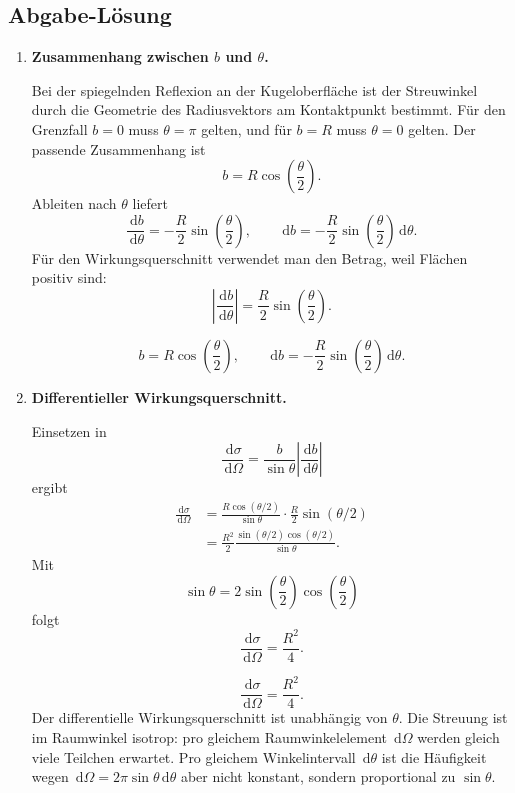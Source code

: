 \documentclass[11pt,a4paper]{scrartcl}
\newcommand{\abs}[1]{\left| #1 \right|}
\newcommand{\paren}[1]{\left( #1 \right)}
\newcommand{\dd}{\,\mathrm{d}}
\newcommand{\dv}[2]{\frac{\dd #1}{\dd #2}}
\newcommand{\diffxs}{\frac{\dd\sigma}{\dd\Omega}}
\theoremstyle{definition}
\theoremstyle{plain}
\theoremstyle{remark}
\begin{document}
\subsection{Abgabe-Lösung}

\begin{enumerate}[label=(\alph*)]
    \item \textbf{Zusammenhang zwischen $b$ und $\theta$.}

    \begin{calculationbox}
    Bei der spiegelnden Reflexion an der Kugeloberfläche ist der Streuwinkel durch die Geometrie des Radiusvektors am Kontaktpunkt bestimmt. Für den Grenzfall $b=0$ muss $\theta=\pi$ gelten, und für $b=R$ muss $\theta=0$ gelten. Der passende Zusammenhang ist
    \[
        b=R\cos\paren{\frac{\theta}{2}}.
    \]
    Ableiten nach $\theta$ liefert
    \[
        \dv{b}{\theta}
        = -\frac{R}{2}\sin\paren{\frac{\theta}{2}},
        \qquad
        \dd b = -\frac{R}{2}\sin\paren{\frac{\theta}{2}}\dd\theta.
    \]
    Für den Wirkungsquerschnitt verwendet man den Betrag, weil Flächen positiv sind:
    \[
        \abs{\dv{b}{\theta} }
        =\frac{R}{2}\sin\paren{\frac{\theta}{2}}.
    \]
    \end{calculationbox}

    \begin{answerbox}
    \[
        \boxed{b=R\cos\paren{\frac{\theta}{2}}},
        \qquad
        \boxed{\dd b=-\frac{R}{2}\sin\paren{\frac{\theta}{2}}\dd\theta}.
    \]
    \end{answerbox}

    \item \textbf{Differentieller Wirkungsquerschnitt.}

    \begin{calculationbox}
    Einsetzen in
    \[
        \diffxs = \frac{b}{\sin\theta}\abs{\dv{b}{\theta}}
    \]
    ergibt
    \begin{align*}
        \diffxs
        &= \frac{R\cos(\theta/2)}{\sin\theta}
           \cdot \frac{R}{2}\sin(\theta/2)\\
        &= \frac{R^2}{2}\frac{\sin(\theta/2)\cos(\theta/2)}{\sin\theta}.
    \end{align*}
    Mit
    \[
        \sin\theta = 2\sin\paren{\frac{\theta}{2}}\cos\paren{\frac{\theta}{2}}
    \]
    folgt
    \[
        \diffxs = \frac{R^2}{4}.
    \]
    \end{calculationbox}

    \begin{answerbox}
    \[
        \boxed{\diffxs=\frac{R^2}{4}}.
    \]
    Der differentielle Wirkungsquerschnitt ist unabhängig von $\theta$. Die Streuung ist im Raumwinkel isotrop: pro gleichem Raumwinkelelement $\dd\Omega$ werden gleich viele Teilchen erwartet. Pro gleichem Winkelintervall $\dd\theta$ ist die Häufigkeit wegen $\dd\Omega=2\pi\sin\theta\dd\theta$ aber nicht konstant, sondern proportional zu $\sin\theta$.
    \end{answerbox}


\end{enumerate}
\end{document}
